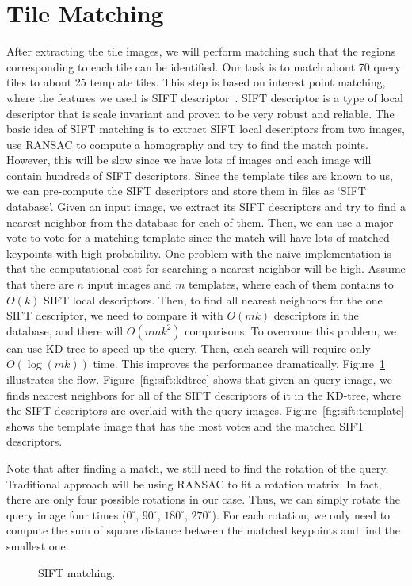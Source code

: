\section{Tile Matching}
\label{sec:matching}
After extracting the tile images, we will perform matching such that the regions
corresponding to each tile can be identified. Our task is to match about 70 query
tiles to about 25 template tiles. This step is based on interest point matching,
where the features we used is SIFT descriptor~\cite{lowe1999object}. SIFT
descriptor is a type of local descriptor that is scale invariant and proven to be
very robust and reliable. The basic idea of SIFT matching is to extract SIFT
local descriptors from two images, use RANSAC to compute a homography and try to
find the match points. However, this will be slow since we have lots of images
and each image will contain hundreds of SIFT descriptors. Since the template
tiles are known to us, we can pre-compute the SIFT descriptors and store them in
files as `SIFT database'. Given an input image, we extract its SIFT descriptors
and try to find a nearest neighbor from the database for each of them. Then, we
can use a major vote to vote for a matching template since the match will have
lots of matched keypoints with high probability. One problem with the naive
implementation is that the computational cost for searching a nearest neighbor
will be high. Assume that there are $n$ input images and $m$ templates, where
each of them contains to $O(k)$ SIFT local descriptors. Then, to find all nearest
neighbors for the one SIFT descriptor, we need to compare it with $O(mk)$
descriptors in the database, and there will $O(nmk^2)$ comparisons. To overcome
this problem, we can use KD-tree to speed up the query. Then, each search will
require only $O(\log (mk))$ time. This improves the performance dramatically.
Figure~\ref{fig:sift} illustrates the flow.
Figure~\ref{fig:sift:kdtree} shows that given an query image,
we finds nearest neighbors for all of the SIFT descriptors of it
in the KD-tree, where the SIFT descriptors are overlaid with the query
images. Figure~\ref{fig:sift:template} shows the template image 
that has the most votes and the matched SIFT descriptors.

Note that after finding a match, we still need to find the rotation of the query.
Traditional approach will be using RANSAC to fit a rotation matrix. In fact,
there are only four possible rotations in our case. Thus, we can simply rotate
the query image four times ($0^\circ$, $90^\circ$, $180^\circ$, $270^\circ$).
For each rotation, we only need to compute the sum of square distance between
the matched keypoints and find the smallest one. 

\begin{figure}[b]
\centering
{}
\caption{SIFT matching.}
\label{fig:sift}
\end{figure}